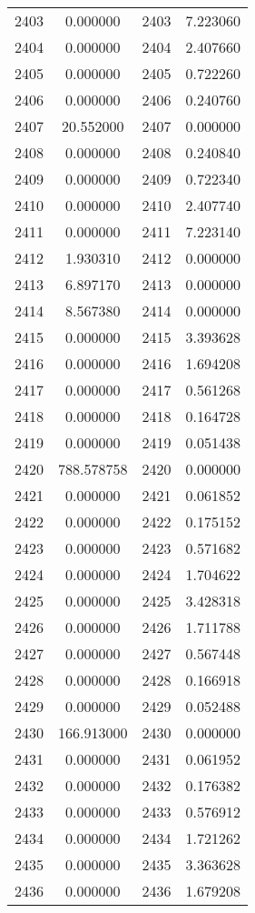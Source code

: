 \documentclass[12pt]{article}
\begin{document}
\begin{longtable}{@{}cccc@{}}
2403 & 0.000000 & 2403 & 7.223060 \\
2404 & 0.000000 & 2404 & 2.407660 \\
2405 & 0.000000 & 2405 & 0.722260 \\
2406 & 0.000000 & 2406 & 0.240760 \\
2407 & 20.552000 & 2407 & 0.000000 \\
2408 & 0.000000 & 2408 & 0.240840 \\
2409 & 0.000000 & 2409 & 0.722340 \\
2410 & 0.000000 & 2410 & 2.407740 \\
2411 & 0.000000 & 2411 & 7.223140 \\
2412 & 1.930310 & 2412 & 0.000000 \\
2413 & 6.897170 & 2413 & 0.000000 \\
2414 & 8.567380 & 2414 & 0.000000 \\
2415 & 0.000000 & 2415 & 3.393628 \\
2416 & 0.000000 & 2416 & 1.694208 \\
2417 & 0.000000 & 2417 & 0.561268 \\
2418 & 0.000000 & 2418 & 0.164728 \\
2419 & 0.000000 & 2419 & 0.051438 \\
2420 & 788.578758 & 2420 & 0.000000 \\
2421 & 0.000000 & 2421 & 0.061852 \\
2422 & 0.000000 & 2422 & 0.175152 \\
2423 & 0.000000 & 2423 & 0.571682 \\
2424 & 0.000000 & 2424 & 1.704622 \\
2425 & 0.000000 & 2425 & 3.428318 \\
2426 & 0.000000 & 2426 & 1.711788 \\
2427 & 0.000000 & 2427 & 0.567448 \\
2428 & 0.000000 & 2428 & 0.166918 \\
2429 & 0.000000 & 2429 & 0.052488 \\
2430 & 166.913000 & 2430 & 0.000000 \\
2431 & 0.000000 & 2431 & 0.061952 \\
2432 & 0.000000 & 2432 & 0.176382 \\
2433 & 0.000000 & 2433 & 0.576912 \\
2434 & 0.000000 & 2434 & 1.721262 \\
2435 & 0.000000 & 2435 & 3.363628 \\
2436 & 0.000000 & 2436 & 1.679208 \\

\end{longtable}
\end{document}
